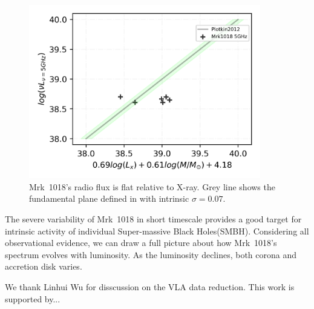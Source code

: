 \documentclass{aastex63}
\begin{document}
\begin{figure}
\centering
	\includegraphics[width=0.9\textwidth]{./pic/Mrk1018_radio_xray_Plotkin2012.png}
    \caption{Mrk~1018's radio flux is flat relative to X-ray. Grey line shows the fundamental plane defined in \citet{2012MNRAS.419..267P} with intrinsic $\sigma=0.07$.}
    \label{fig:radio-xray-mass_relation_Plotkin2012}
\end{figure}


The severe variability of Mrk~1018 in short timescale provides a good target for intrinsic activity of individual Super-massive Black Holes(SMBH). Considering all observational evidence, we can draw a full picture about how Mrk~1018's spectrum evolves with luminosity. As the luminosity declines, both corona and accretion disk varies.  



\acknowledgments

We thank Linhui Wu for disscussion on the VLA data reduction. This work is supported by...

%
\end{document}
